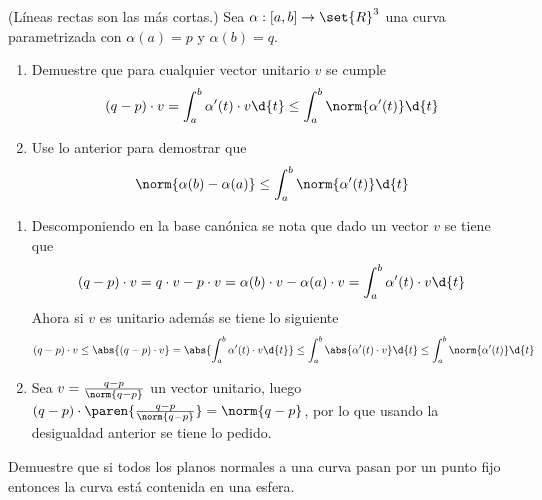 \documentclass{homework}
\begin{document}
\begin{prob}
    (Líneas rectas son las más cortas.) Sea \(\alpha:[a,b]\rightarrow \set{R}^3\) una curva parametrizada con \(\alpha(a)=p\) y \(\alpha(b)=q\).
    \begin{enumerate}
        \item Demuestre que para cualquier vector unitario \(v\) se cumple
              \begin{equation*}
                  (q-p)\cdot v=\int_a^b\alpha'(t)\cdot v\d{t} \leq\int_a^b\norm{\alpha'(t)}\d{t}
              \end{equation*}
        \item Use lo anterior para demostrar que
              \begin{equation*}
                  \norm{\alpha(b)-\alpha(a)}\leq\int_a^b\norm{\alpha'(t)}\d{t}
              \end{equation*}
    \end{enumerate}
\end{prob}

\begin{sol}
    \begin{enumerate}
        \item Descomponiendo en la base canónica se nota que dado un vector \(v\) se tiene que
              \begin{equation*}
                  (q-p)\cdot v=q\cdot v-p\cdot v=\alpha(b)\cdot v-\alpha(a)\cdot v=\int_a^b\alpha'(t)\cdot v\d{t}
              \end{equation*}
              Ahora si \(v\) es unitario además se tiene lo siguiente
              \begin{equation*}
                  (q-p)\cdot v\leq\abs{(q-p)\cdot v}=\abs{\int_a^b\alpha'(t)\cdot v\d{t}}\leq\int_a^b\abs{\alpha'(t)\cdot v}\d{t}\leq\int_a^b\norm{\alpha'(t)}\d{t}
              \end{equation*}
        \item Sea \(v=\frac{q-p}{\norm{q-p}}\) un vector unitario, luego \((q-p)\cdot\paren{\frac{q-p}{\norm{q-p}}}=\norm{q-p}\), por lo que usando la desigualdad anterior se tiene lo pedido.
    \end{enumerate}
\end{sol}


\begin{prob}
    Demuestre que si todos los planos normales a una curva pasan por un punto fijo entonces la curva está contenida en una esfera.
\end{prob}
\end{document}
